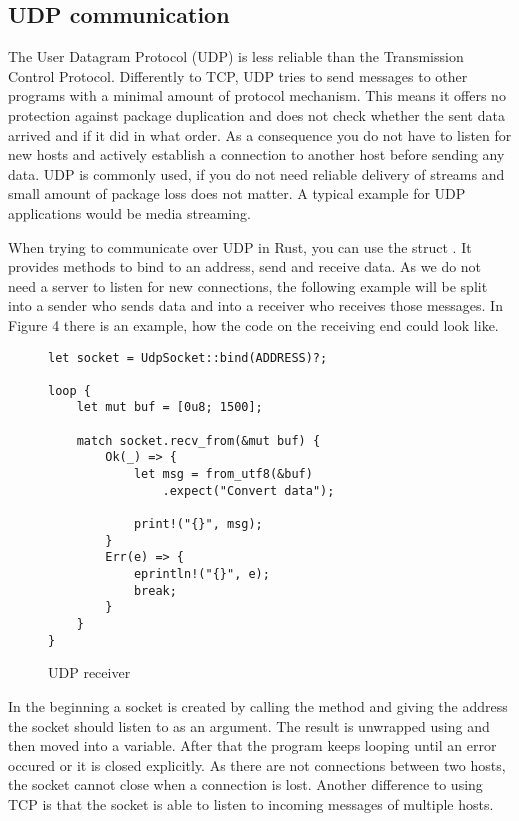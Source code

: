 \subsection{UDP communication}
The User Datagram Protocol (UDP) is less reliable than the Transmission Control Protocol. Differently to TCP, UDP tries
to send messages to other programs with a minimal amount of protocol mechanism. This means it offers no protection
against package duplication and does not check whether the sent data arrived and if it did in what order. As a
consequence you do not have to listen for new hosts and actively establish a connection to another host before sending
any data. UDP is commonly used, if you do not need reliable delivery of streams and small amount of package loss does
not matter. A typical example for UDP applications would be media streaming. \cite{RFC0768}

When trying to communicate over UDP in Rust, you can use the struct . It provides methods to
bind to an address, send and receive data. As we do not need a server to listen for new connections, the following
example will be split into a sender who sends data and into a receiver who receives those messages. In Figure 4 there
is an example, how the code on the receiving end could look like.

\begin{figure}[ht]
    \begin{verbatim}
let socket = UdpSocket::bind(ADDRESS)?;

loop {
    let mut buf = [0u8; 1500];

    match socket.recv_from(&mut buf) {
        Ok(_) => {
            let msg = from_utf8(&buf)
                .expect("Convert data");

            print!("{}", msg);
        }
        Err(e) => {
            eprintln!("{}", e);
            break;
        }
    }
}
    \end{verbatim}
    \caption{UDP receiver}
\end{figure}

In the beginning a socket is created by calling the  method and giving the address the socket should listen
to as an argument. The result is unwrapped using  and then moved into a variable. After that the program keeps
looping until an error occured or it is closed explicitly. As there are not connections between two hosts, the socket
cannot close when a connection is lost. Another difference to using TCP is that the socket is able to listen to
incoming messages of multiple hosts.

